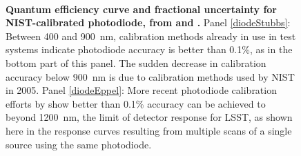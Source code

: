 \documentclass[12pt,preprint]{aastex}
\begin{document}
\begin{figure}
\centering
{} \\
\caption{{\small
{\bf Quantum efficiency curve and fractional uncertainty for
NIST-calibrated photodiode, from \citet{Stubbs2010a} and
\citet{Eppeldauer09}.}  Panel \ref{diodeStubbs}: Between 400 and 900~nm, calibration
methods already in use in test systems indicate photodiode accuracy is
better than 0.1\%, as in the bottom part of this panel.  The sudden
decrease in calibration accuracy below 900~nm is due to calibration
methods used by NIST in 2005. Panel \ref{diodeEppel}: More recent photodiode
calibration efforts by \citet{Eppeldauer09} show better than 0.1\%
accuracy can be achieved to beyond 1200~nm, the limit of detector
response for LSST, as shown here in the response curves resulting from
multiple scans of a single source using the same photodiode.} }
\label{fig:NIST_diode}
\end{figure}
\end{document}

